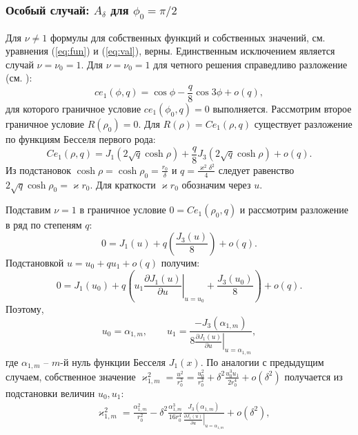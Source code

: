 \subsubsection{Особый случай: $A_\delta$ для $\phi_0=\pi/2$}\label{sec:ch2/sec2/sub1/sub2}


Для $\nu\ne 1$ формулы для собственных функций и собственных значений, см. уравнения (\ref{eq:fun}) и (\ref{eq:val}), верны. Единственным исключением является случай  $\nu=\nu_0=1$.
Для $\nu=\nu_0=1$ для четного решения справедливо разложение (см. \cite[Subsect.~20.2.27]{wref2}):
\begin{equation*}
ce_1(\phi, q) = 	\cos{\phi}  - \frac{q}{8} \cos{3\phi} + o(q),
 \end{equation*}
для которого граничное условие  $ce_1(\phi_0, q)=0$ выполняется. 
Рассмотрим второе граничное условие $R(\rho_0) = 0$.
Для $R(\rho) = Ce_1(\rho, q)$ существует разложение по функциям Бесселя первого рода:
\begin{equation*}
Ce_1(\rho, q) = J_1(2\sqrt{q} \cosh{\rho}) + \frac{q}{8} J_3(2\sqrt{q}\cosh{\rho}) + o(q).
\end{equation*}
Из подстановок $\cosh\rho = \cosh\rho_0 =  \frac{r_0}{\delta}$ и $q = \frac{\varkappa^2 \delta^2}{4}$ следует равенство
$2\sqrt{q} \cosh{\rho_0} =  \varkappa r_0$. Для краткости $\varkappa r_0$ обозначим через $u$. 

Подставим $\nu = 1$ в граничное условие $0 = Ce_1(\rho_0, q)$ и рассмотрим разложение в ряд по степеням   $q$:
\begin{equation*}
    0 = J_1(u) + q \left( \frac{J_3(u)}{8} \right) + o(q).
\end{equation*}
Подстановкой  $u = u_0 + q u_1 + o(q)$ получим:
\begin{equation*}
    0 = 
    J_1(u_0) + q \left( 
    u_1 \left.\frac{\partial J_1 (u)}{\partial u}\right|_{u=u_0}
    + \frac{J_3(u_0)}{8}
    \right) + o(q).
\end{equation*}
Поэтому, 
\begin{equation*}
u_0 = \alpha_{1, m}, \qquad u_1 = 
\frac{ - J_3(\alpha_{1, m}) }{8\left.
\frac{\partial J_1 (u)}{\partial u}\right|_{u=\alpha_{1, m}}},
\end{equation*}
где $\alpha_{1, m}$ -- $m$-й нуль функции Бесселя  $J_1(x)$. По аналогии с предыдущим случаем,
собственное значение $\varkappa_{1, m}^2 = \frac{u^2}{r_0^2} = \frac{u_0^2}{r_0^2} + \delta^2 \frac{u_0^3 u_1}{2r_0^4} + o(\delta^2)$ получается из подстановки величин  $u_0, u_1$:
\begin{align}
   & \varkappa_{1, m}^2 = \frac{\alpha_{1, m}^2}{r_0^2} - \delta^2 \frac{\alpha_{1, m}^3}{16r_0^4} 
    \frac{J_3(\alpha_{1, m})}{\left.\frac{\partial J_1 (u)}{\partial u}\right|_{u=\alpha_{1, m}}} 
    + o(\delta^2), \label{eq:valS1}
    \end{align}



